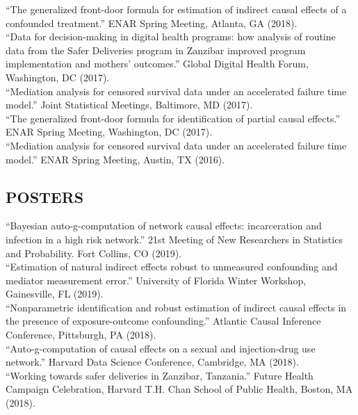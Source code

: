 \documentclass[12pt]{article}
\begin{document}

``The generalized front-door formula for estimation of indirect causal effects of a confounded treatment.'' ENAR Spring Meeting, Atlanta, GA (2018). \\

``Data for decision-making in digital health programs: how analysis of routine data from the Safer Deliveries program in Zanzibar improved program implementation and mothers' outcomes.'' Global Digital Health Forum, Washington, DC (2017). \\

``Mediation analysis for censored survival data under an accelerated failure time model.'' Joint Statistical Meetings, Baltimore, MD (2017). \\

``The generalized front-door formula for identification of partial causal effects.'' ENAR Spring Meeting, Washington, DC (2017). \\

``Mediation analysis for censored survival data under an accelerated failure time model.'' ENAR Spring Meeting, Austin, TX (2016). 

\subsection*{\textbf{ POSTERS}}

``Bayesian auto-g-computation of network causal effects: incarceration and infection in a high risk network.'' 21st Meeting of New Researchers in 
Statistics and Probability. Fort Collins, CO (2019). \\

``Estimation of natural indirect effects robust to unmeasured confounding and mediator measurement error.'' University of Florida Winter Workshop, Gainesville, FL (2019). \\

``Nonparametric identification and robust estimation of indirect causal effects in the presence of exposure-outcome confounding.'' Atlantic Causal Inference Conference, Pittsburgh, PA (2018). \\

``Auto-g-computation of causal effects on a sexual and injection-drug use network.'' Harvard Data Science Conference, Cambridge, MA (2018). \\

``Working towards safer deliveries in Zanzibar, Tanzania.'' Future Health Campaign Celebration, Harvard T.H. Chan School of Public Health, Boston, MA (2018). \\
\end{document}
